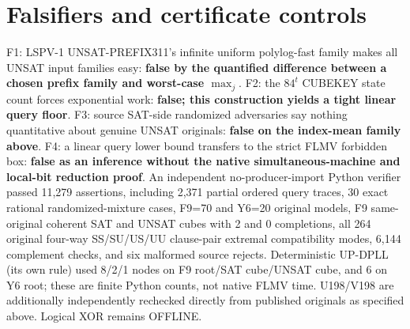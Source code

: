 \documentclass[11pt]{article}
\begin{document}
\section{Falsifiers and certificate controls}
F1: LSPV-1 UNSAT-PREFIX311's infinite uniform polylog-fast family makes all UNSAT input families easy: \textbf{false by the quantified difference between a chosen prefix family and worst-case $\max_j$}. F2: the $84^t$ CUBEKEY state count forces exponential work: \textbf{false; this construction yields a tight linear query floor}. F3: source SAT-side randomized adversaries say nothing quantitative about genuine UNSAT originals: \textbf{false on the index-mean family above}. F4: a linear query lower bound transfers to the strict FLMV forbidden box: \textbf{false as an inference without the native simultaneous-machine and local-bit reduction proof}.
An independent no-producer-import Python verifier passed 11,279 assertions, including 2,371 partial ordered query traces, 30 exact rational randomized-mixture cases, F9=70 and Y6=20 original models, F9 same-original coherent SAT and UNSAT cubes with 2 and 0 completions, all 264 original four-way SS/SU/US/UU clause-pair extremal compatibility modes, 6,144 complement checks, and six malformed source rejects. Deterministic UP-DPLL (its own rule) used 8/2/1 nodes on F9 root/SAT cube/UNSAT cube, and 6 on Y6 root; these are finite Python counts, not native FLMV time. U198/V198 are additionally independently rechecked directly from published originals as specified above. Logical XOR remains OFFLINE.
\end{document}
